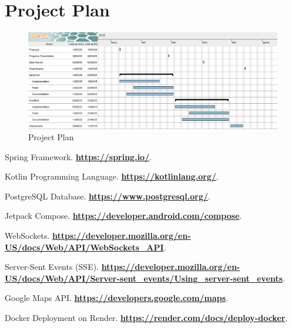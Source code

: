 \documentclass[a4paper,twoside,11pt]{article}
\begin{document}
\section*{Project Plan}

\begin{figure}[h]
    \centering
    \includegraphics[width=\textwidth]{ProjectPlan.png}
    \caption{Project Plan}
    \label{fig:project-plan}
\end{figure}


\begin{thebibliography}{9}

Spring Framework. \textbf{\url{https://spring.io/}}.

Kotlin Programming Language. \textbf{\url{https://kotlinlang.org/}}.

PostgreSQL Database. \textbf{\url{https://www.postgresql.org/}}.

Jetpack Compose. \textbf{\url{https://developer.android.com/compose}}.

WebSockets. \textbf{\url{https://developer.mozilla.org/en-US/docs/Web/API/WebSockets_API}}. 

Server-Sent Events (SSE). \textbf{\url{https://developer.mozilla.org/en-US/docs/Web/API/Server-sent_events/Using_server-sent_events}}.

Google Maps API. \textbf{\url{https://developers.google.com/maps}}.

Docker Deployment on Render. \textbf{\url{https://render.com/docs/deploy-docker}}.

\end{thebibliography}
\end{document}
